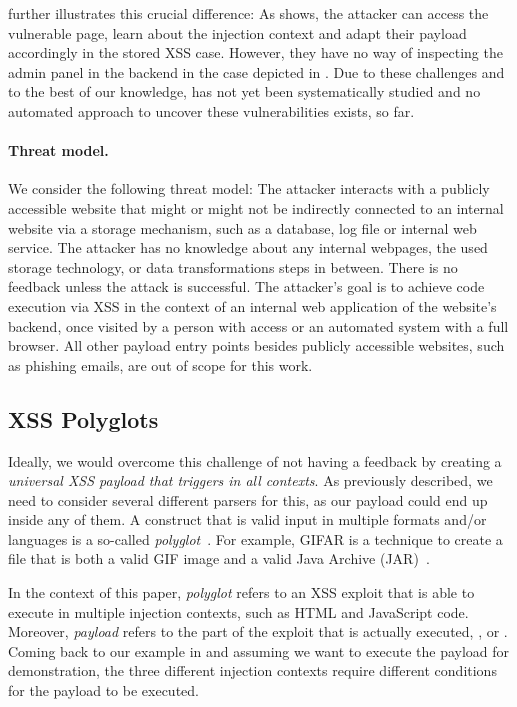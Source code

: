  further illustrates this crucial difference:
As  shows, the attacker can access the vulnerable page, learn about the injection context and adapt their payload accordingly in the stored XSS case.
However, they have no way of inspecting the admin panel in the backend in the \blindxss{} case depicted in .
Due to these challenges and to the best of our knowledge, \blindxss{} has not yet been systematically studied and no automated approach to uncover these vulnerabilities exists, so far.

\vspace{-1em}\paragraph{Threat model.} We consider the following threat model:
The attacker interacts with a publicly accessible website that might or might not be indirectly connected to an internal website via a storage mechanism, such as a database, log file or internal web service.
The attacker has no knowledge about any internal webpages, the used storage technology, or data transformations steps in between. 
There is no feedback unless the attack is successful.
The attacker's goal is to achieve code execution via XSS in the context of an internal web application of the website's backend, once visited by a person with access or an automated system with a full browser.
All other payload entry points besides publicly accessible websites, such as phishing emails, are out of scope for this work.

\subsection{XSS Polyglots}\label{sec:polyglots-background}
Ideally, we would overcome this challenge of not having a feedback by creating a \emph{universal XSS payload that triggers in all contexts}.
As previously described, we need to consider several different parsers for this, as our payload could end up inside any of them.
A construct that is valid input in multiple formats and/or languages is a so-called \emph{polyglot}~\cite{magazinius2013polyglots}.
For example, GIFAR is a technique to create a file that is both a valid GIF image and a valid Java Archive (JAR)~\cite{brandis2009exploring}.

In the context of this paper, \emph{polyglot} refers to an XSS exploit that is able to execute in multiple injection contexts, such as HTML and JavaScript code.
Moreover, \emph{payload} refers to the part of the exploit that is actually executed, \eg,  or .
Coming back to our example in  and assuming we want to execute the payload  for demonstration, the three different injection contexts require different conditions for the payload to be executed.

